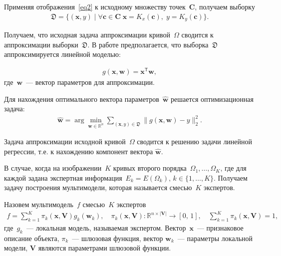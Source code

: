 \documentclass[12pt]{a&t}
\begin{document}
Применяя отображения~\eqref{eq2} к исходному множеству точек~$\mathbf{C}$, получаем выборку
\begin{gather}
\label{eq4}
    \mathfrak{D} = \{(\mathbf{x}, y) \; | \; \forall \mathbf{c} \in \mathbf{C} \; \mathbf{x} = K_x(\mathbf{c}), \; y = K_y(\mathbf{c}) \}.
\end{gather}

Получаем, что исходная задача аппроксимации кривой~$\Omega$ сводится к аппроксимации выборки~$\mathfrak{D}$. В работе предполагается, что выборка~$\mathfrak{D}$ аппроксимируется линейной моделью:

\begin{gather}
	g(\mathbf{x}, \mathbf{w}) = \mathbf{x}^\mathsf{T} \mathbf{w},
\end{gather} 
где~$\mathbf{w}$~--- вектор параметров для аппроксимации.

Для нахождения оптимального вектора параметров~$\hat{\mathbf {w}}$ решается оптимизационная задача:
\begin{gather}
	\hat{\mathbf{w}} = \arg\min_{\mathbf{w}\in\mathbb{R}^n} \sum_{\left(\mathbf{x}, y\right) \in \mathfrak{D}}\|g(\mathbf{x}, \mathbf{w}) - y \|_2^2.
\end{gather} 

Задача аппроксимации исходной кривой~$\Omega$ сводится к решению задачи линейной регрессии, т.е. к нахождению компонент вектора $\hat{\mathbf{w}}$.

В случае, когда на изображении~$K$ кривых второго порядка~$\Omega_1, \dots, \Omega_K$, где для каждой задана экспертная информация~$E_k = E(\Omega_k), \, k \in \{1, \dots, K\}.$ Получаем задачу построения мультимодели, которая называется смесью~$K$ экспертов.

\begin{definition}
Назовем мультимодель~$f$ смесью~$K$ экспертов
\begin{gather}
	f = \sum\limits_{k = 1}^{K}\pi_k(\mathbf{x}, \mathbf{V})g_k(\mathbf{w}_k),  \quad \pi_k(\mathbf{x}, \mathbf{V}): \mathbb{R}^{n\times |\mathbf{V}|} \rightarrow [0, \, 1], \quad \sum\limits_{k = 1}^{K}\pi_k(\mathbf{x}, \mathbf{V}) = 1, 
\end{gather}
где~$g_k$~--- локальная модель, называемая экспертом. Вектор~$\mathbf{x}$~--- признаковое описание объекта, $\pi_k$~--- шлюзовая функция, вектор $\mathbf{w}_k$~--- параметры локальной модели, $\mathbf{V}$ являются параметрами шлюзовой функции.
\end{definition}
\end{document}
